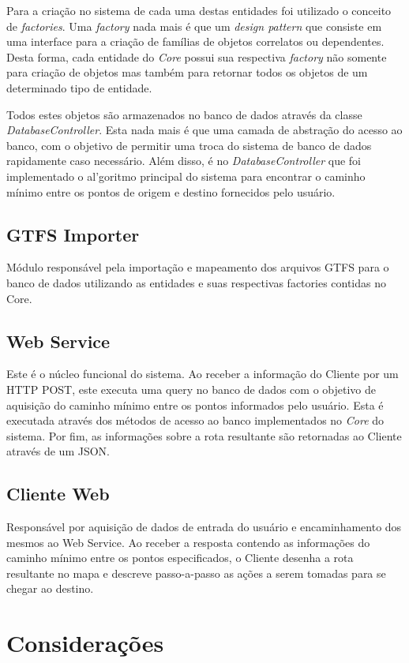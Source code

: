 Para a criação no sistema de cada uma destas entidades foi utilizado o conceito de \emph{factories}. 
Uma \emph{factory} nada mais é que um \emph{design pattern} que consiste em uma interface para a criação de famílias de objetos correlatos ou dependentes.
Desta forma, cada entidade do \emph{Core} possui sua respectiva \emph{factory} não somente para criação de objetos mas também para retornar todos os objetos de um determinado tipo de entidade.

Todos estes objetos são armazenados no banco de dados através da classe \emph{DatabaseController}.
Esta nada mais é que uma camada de abstração do acesso ao banco, com o objetivo de permitir uma troca do sistema de banco de dados rapidamente caso necessário.
Além disso, é no \emph{DatabaseController} que foi implementado o al'goritmo principal do sistema para encontrar o caminho mínimo entre os pontos de origem e destino fornecidos pelo usuário.


\subsection{GTFS Importer}
Módulo responsável pela importação e mapeamento dos arquivos GTFS para o banco de dados utilizando as entidades e suas respectivas factories contidas no Core. 

\subsection{Web Service}
Este é o núcleo funcional do sistema.
Ao receber a informação do Cliente por um HTTP POST, este executa uma query no banco de dados com o objetivo de aquisição do caminho mínimo entre os pontos informados pelo usuário. 
Esta é executada através dos métodos de acesso ao banco implementados no \emph{Core} do sistema. 
Por fim, as informações sobre a rota resultante são retornadas ao Cliente através de um JSON.

\subsection{Cliente Web}
Responsável por aquisição de dados de entrada do usuário e encaminhamento dos mesmos ao Web Service. 
Ao receber a resposta contendo as informações do caminho mínimo entre os pontos especificados, o Cliente desenha a rota resultante no mapa e descreve passo-a-passo as ações a serem tomadas para se chegar ao destino.

\section{Considerações}

